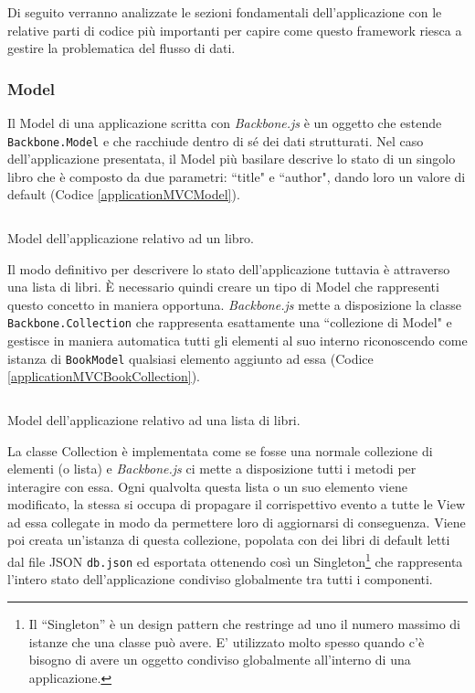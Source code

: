 Di seguito verranno analizzate le sezioni fondamentali dell'applicazione con le relative parti di codice più importanti per capire come questo framework riesca a gestire la problematica del flusso di dati.

\subsubsection*{Model}
Il Model di una applicazione scritta con \textit{Backbone.js} è un oggetto che estende \texttt{Backbone.Model} e che racchiude dentro di sé dei dati strutturati. Nel caso dell'applicazione presentata, il Model più basilare descrive lo stato di un singolo libro che è composto da due parametri: “title" e “author", dando loro un valore di default (Codice \ref{applicationMVCModel}).

\begin{listing}[ht]
\inputminted{Javascript}{sources/applicationMVCBookModel.js}
\caption{Model dell'applicazione relativo ad un libro.} 
\label{applicationMVCModel} 
\end{listing}

Il modo definitivo per descrivere lo stato dell'applicazione tuttavia è attraverso una lista di libri. È necessario quindi creare un tipo di Model che rappresenti questo concetto in maniera opportuna. \textit{Backbone.js} mette a disposizione la classe \texttt{Backbone.Collection} che rappresenta esattamente una “collezione di Model" e gestisce in maniera automatica tutti gli elementi al suo interno riconoscendo come istanza di \texttt{BookModel} qualsiasi elemento aggiunto ad essa (Codice \ref{applicationMVCBookCollection}).

\begin{listing}[ht]
\inputminted{Javascript}{sources/applicationMVCBookshelfCollection.js}
\caption{Model dell'applicazione relativo ad una lista di libri.} 
\label{applicationMVCBookCollection} 
\end{listing}

La classe Collection è implementata come se fosse una normale collezione di elementi (o lista) e \textit{Backbone.js} ci mette a disposizione tutti i metodi per interagire con essa. 
Ogni qualvolta questa lista o un suo elemento viene modificato, la stessa si occupa di propagare il corrispettivo evento a tutte le View ad essa collegate in modo da permettere loro di aggiornarsi di conseguenza.
Viene poi creata un'istanza di questa collezione, popolata con dei libri di default letti dal file JSON \texttt{db.json} ed esportata ottenendo così un Singleton\footnote{Il “Singleton” è un design pattern che restringe ad uno il numero massimo di istanze che una classe può avere. E' utilizzato molto spesso quando c'è bisogno di avere un oggetto condiviso globalmente all'interno di una applicazione.} che rappresenta l'intero stato dell'applicazione condiviso globalmente tra tutti i componenti.

